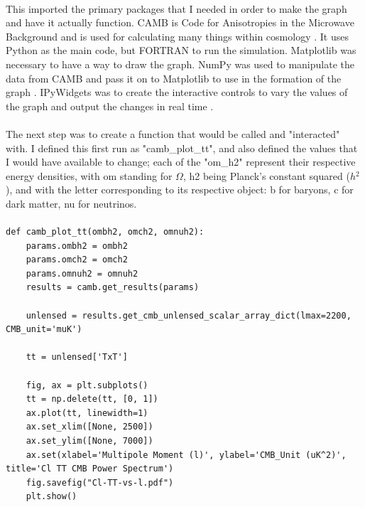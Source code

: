 \documentclass[twoside, fontsize=12pt,
     bibliography=totoc, %
     listof=totoc, %
     index=totoc, %
     onehalfspacing %
]{_MScDiss2017_cls}
\begin{document}
\paragraph{}
This imported the primary packages that I needed in order to make the graph and have it actually function. CAMB is Code for Anisotropies in the Microwave Background and is used for calculating many things within cosmology \cite{PythonCAMB}. It uses Python as the main code, but FORTRAN to run the simulation. Matplotlib was necessary to have a way to draw the graph. NumPy was used to manipulate the data from CAMB and pass it on to Matplotlib to use in the formation of the graph \cite{numpy}. IPyWidgets was to create the interactive controls to vary the values of the graph and output the changes in real time \cite{widgets}.

\paragraph{}

The next step was to create a function that would be called and "interacted" with. I defined this first run as "camb\_plot\_tt", and also defined the values that I would have available to change; each of the "om\_h2" represent their respective energy densities, with om standing for $\Omega$, h2 being Planck's constant squared ($h$$^2$), and with the letter corresponding to its respective object: b for baryons, c for dark matter, nu for neutrinos.

\paragraph{}

\begin{lstfloat}
\begin{lstlisting}[caption={Initialising the first plot}, captionpos=b]
%matplotlib inline
def camb_plot_tt(ombh2, omch2, omnuh2):
    params.ombh2 = ombh2
    params.omch2 = omch2
    params.omnuh2 = omnuh2
    results = camb.get_results(params)

    unlensed = results.get_cmb_unlensed_scalar_array_dict(lmax=2200, CMB_unit='muK')

    tt = unlensed['TxT']

    fig, ax = plt.subplots()
    tt = np.delete(tt, [0, 1])
    ax.plot(tt, linewidth=1)
    ax.set_xlim([None, 2500])
    ax.set_ylim([None, 7000])
    ax.set(xlabel='Multipole Moment (l)', ylabel='CMB_Unit (uK^2)', title='Cl TT CMB Power Spectrum')
    fig.savefig("Cl-TT-vs-l.pdf")
    plt.show()

\end{lstlisting}
\end{lstfloat}
\end{document}
